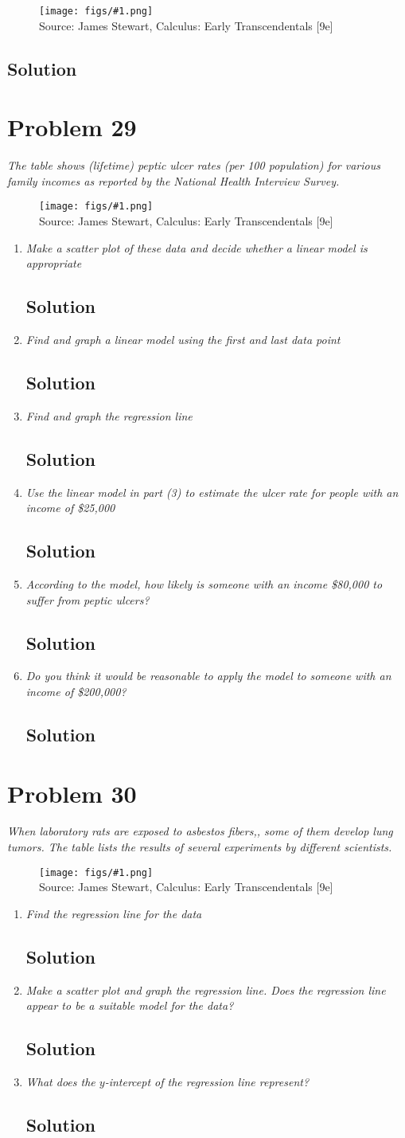\documentclass[11pt]{article}
\newcommand{\soln}{\subsection*}
\newcommand{\qn}{\textit}
\newcommand{\imagesource}[1]{{\footnotesize Source: #1}}
\newcommand{\imgqn}[1]{
	\begin{figure}[H]
		\centering
		\texttt{[image: figs/\#1.png]}\\
		\imagesource{James Stewart, Calculus: Early Transcendentals [9e]}
	\end{figure}
}
\begin{document}
\imgqn{1.2.28}

\soln{Solution}

\section*{Problem 29}

\qn{The table shows (lifetime) peptic ulcer rates (per 100 population) for various family incomes as reported by the National Health Interview Survey.}

\imgqn{1.2.29}

\begin{enumerate}
	\item \qn{Make a scatter plot of these data and decide whether a linear model is appropriate}
	\soln{Solution}
	
	\item \qn{Find and graph a linear model using the first and last data point}
	\soln{Solution}
	
	\item \qn{Find and graph the regression line}
	\soln{Solution}
	
	\item \qn{Use the linear model in part (3) to estimate the ulcer rate for people with an income of \$25,000}
	\soln{Solution}
	
	\item \qn{According to the model, how likely is someone with an income \$80,000 to suffer from peptic ulcers?}
	\soln{Solution}
	
	\item \qn{Do you think it would be reasonable to apply the model to someone with an income of \$200,000?}
	\soln{Solution}
\end{enumerate}

\section*{Problem 30}

\qn{When laboratory rats are exposed to asbestos fibers,, some of them develop lung tumors. The table lists the results of several experiments by different scientists.}

\imgqn{1.2.30}

\begin{enumerate}
	\item \qn{Find the regression line for the data}
	\soln{Solution}
	
	\item \qn{Make a scatter plot and graph the regression line. Does the regression line appear to be a suitable model for the data?}
	\soln{Solution}
	
	\item \qn{What does the $y$-intercept of the regression line represent?}
	\soln{Solution}
\end{enumerate}
\end{document}
